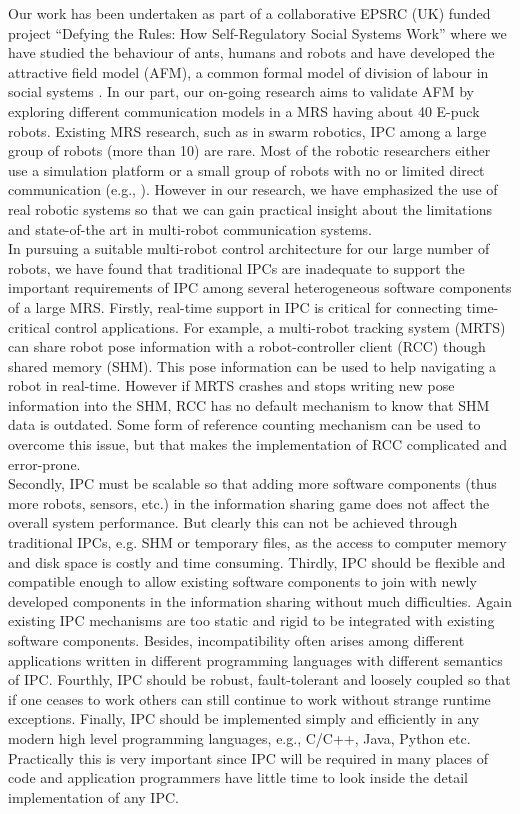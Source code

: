 \documentclass{ifacconf}
\begin{document}
Our work has been undertaken as part of a collaborative EPSRC (UK) funded project ``Defying the Rules: How Self-Regulatory Social Systems Work” where we have studied the behaviour of ants, humans and robots and have developed the attractive field model (AFM), a common formal model of division of labour in social systems \cite{Arcaute+2008}. In our part, our on-going research aims to validate AFM by exploring different communication models in a MRS having about 40 E-puck robots.  Existing MRS research, such as in swarm robotics, IPC among a large group of robots (more than 10) are rare. Most of the robotic researchers either use a simulation platform or a small group of robots with no or limited direct communication (e.g., \cite{Labella2007}).   However in our research, we have emphasized the use of real robotic systems so that we can gain practical insight about the limitations and state-of-the art in multi-robot communication systems.\\
In pursuing a suitable multi-robot control architecture for our large number of robots, we have found that traditional IPCs are inadequate to support the important requirements of IPC among several heterogeneous software components of a large MRS. Firstly, real-time support in IPC is critical for connecting time-critical control applications. For example, a multi-robot tracking system (MRTS) can share robot pose information with a robot-controller client (RCC) though shared memory (SHM). This pose information can be used to help navigating a robot in real-time. However if MRTS crashes and stops writing new pose information into the SHM, RCC has no default mechanism to know that SHM data is outdated. Some form of reference counting mechanism can be used to overcome this issue, but that makes the implementation of RCC complicated and error-prone.\\
Secondly, IPC must be scalable so that adding more software components (thus more robots, sensors, etc.) in the information sharing game does not affect the overall system performance. But clearly this can not be achieved through traditional IPCs, e.g. SHM or temporary files,  as the access to computer memory and disk space is costly and time consuming. Thirdly, IPC should be flexible and compatible enough to allow existing software components to join with newly developed components in the information sharing without much difficulties. Again existing IPC mechanisms are too static and rigid to be integrated with existing software components. Besides, incompatibility often arises among different applications written in different programming languages with different semantics of IPC. Fourthly, IPC should be robust, fault-tolerant and loosely coupled so that if one ceases to work others can still continue to work without strange runtime exceptions. Finally, IPC should be implemented simply and efficiently in any modern high level programming languages, e.g., C/C++, Java, Python etc. Practically this is very important since IPC will be required in many places of code and application programmers have little time to look inside the detail implementation of any IPC.\\
\end{document}
